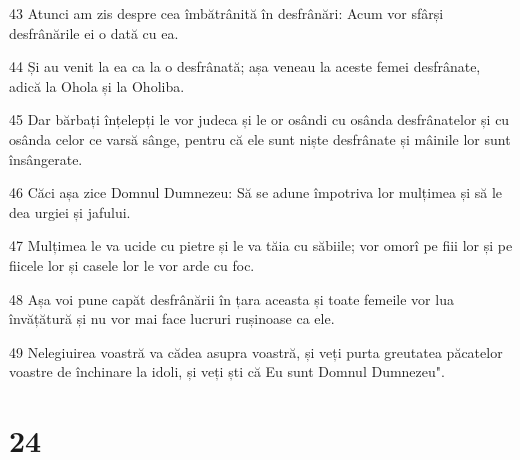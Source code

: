 \par 43 Atunci am zis despre cea îmbătrânită în desfrânări: Acum vor sfârși desfrânările ei o dată cu ea.
\par 44 Și au venit la ea ca la o desfrânată; așa veneau la aceste femei desfrânate, adică la Ohola și la Oholiba.
\par 45 Dar bărbați înțelepți le vor judeca și le or osândi cu osânda desfrânatelor și cu osânda celor ce varsă sânge, pentru că ele sunt niște desfrânate și mâinile lor sunt însângerate.
\par 46 Căci așa zice Domnul Dumnezeu: Să se adune împotriva lor mulțimea și să le dea urgiei și jafului.
\par 47 Mulțimea le va ucide cu pietre și le va tăia cu săbiile; vor omorî pe fiii lor și pe fiicele lor și casele lor le vor arde cu foc.
\par 48 Așa voi pune capăt desfrânării în țara aceasta și toate femeile vor lua învățătură și nu vor mai face lucruri rușinoase ca ele.
\par 49 Nelegiuirea voastră va cădea asupra voastră, și veți purta greutatea păcatelor voastre de închinare la idoli, și veți ști că Eu sunt Domnul Dumnezeu".

\chapter{24}

